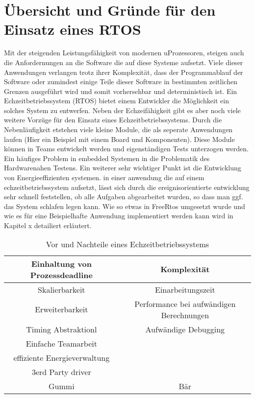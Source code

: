 \documentclass[ngerman]{seminarvorlage}
\begin{document}
\section{Übersicht und Gründe für den Einsatz eines RTOS}
Mit der steigenden Leistungsfähigkeit von modernen uProzessoren, steigen auch die Anfordernungen an die Software die auf diese Systeme aufsetzt.
Viele dieser Anwendungen verlangen trotz ihrer Komplexität, dass der Programmablauf der Software oder zumindest einige Teile dieser Software in bestimmten zeitlichen Grenzen ausgeführt wird und somit vorhersehbar und deterministisch ist.
Ein Echzeitbetriebssystem (RTOS) bietet einem Entwickler die Möglichkeit ein solches System zu entwerfen. Neben der Echzeifähigkeit gibt es aber noch viele weitere Vorzüge für den Einsatz eines Echzeitbetriebssystems. Durch die Nebenläufigkeit etstehen viele kleine Module, die als seperate Anwendungen laufen (Hier ein Beispiel mit einem Board und Komponenten). Diese Module können in Teams entwickelt werden und eigenständigen Tests unterzogen werden. Ein häufiges Problem in embedded Systemen in die Problematik des Hardwarenahen Testens. Ein weiterer sehr wichtiger Punkt ist die Entwicklung von Energieeffizienten systemen. in einer anwendung die auf einem echzeitbetriebssystem aufsetzt, lässt sich durch die ereignisorientierte entwicklung sehr schnell feststellen, ob alle Aufgaben abgearbeitet wurden, so dass man ggf. das System schlafen legen kann. Wie so etwas in FreeRtos umgesetzt wurde und wie es für eine Beispielhafte Anwendung implementiert werden kann wird in Kapitel x detailiert erläutert.  




\begin{table}[hp]\large
\begin{center}
\begin{tabular}{|c|c|}
\hline
Einhaltung von Prozessdeadline & Komplexität \\
\hline
Skalierbarkeit & Einarbeitungszeit\\
\hline
Erweiterbarkeit & Performance bei aufwändigen Berechnungen\\
\hline
Timing Abstraktionl & Aufwändige Debugging\\
\hline
Einfache Teamarbeit & \\
\hline
effiziente Energieverwaltung & \\
\hline
3erd Party driver& \\
\hline
Gummi & Bär \\
\hline
\end{tabular}
\end{center}
\caption{Vor und Nachteile eines Echzeitbetriebssystems}
\label{tttabelle}
\end{table}
\end{document}
